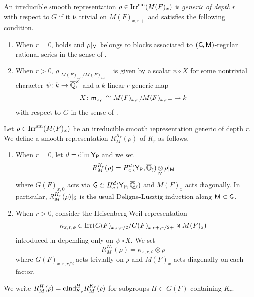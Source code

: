 \documentclass[12pt,reqno]{amsart}
\begin{document}
\begin{defi}
    An irreducible smooth representation $\rho \in {\operatorname{Irr}}^{\operatorname{sm}}(M(F)_{x})$ is \textit{generic of depth $r$} with respect to $G$ if it is trivial on $M(F)_{x, r+}$ and satisfies the following condition. 
    \begin{enumerate}
        \item When $r = 0$,  holds and $\rho \vert_{{\mathsf{M}}}$ belongs to blocks associated to $({\mathsf{G}}, {\mathsf{M}})$-regular rational series in the sense of \cite[{}11.4]{BR03}. 
        \item When $r > 0$, $\rho \vert_{M(F)_{x, r} / M(F)_{x, r+}}$ is given by a scalar $\psi \circ X$ for some nontrivial character $\psi \colon k \to {\overline{\mathbb{Q}}_\ell^\times}$ and a $k$-linear $r$-generic map 
        \[
            X \colon {\mathsf{m}}_{x, r} \cong M(F)_{x, r} / M(F)_{x, r+} \to k
        \]
        with respect to $G$ in the sense of \cite[Definition 3.1]{Tak26_Yu}. 
    \end{enumerate}
\end{defi}

\begin{defi} \label{defi:R_induction}
    Let $\rho \in {\operatorname{Irr}}^{\operatorname{sm}}(M(F)_{x})$ be an irreducible smooth representation generic of depth $r$. We define a smooth representation $R^{K_r}_M(\rho)$ of $K_r$ as follows. 
    \begin{enumerate}
        \item When $r = 0$, let $d = \dim {\mathsf{Y}}_{{\mathsf{P}}}$ and we set
        \[
            R^{K_r}_M(\rho) = H_c^d({\mathsf{Y}}_{{\mathsf{P}}}, {\overline{\mathbb{Q}}_\ell}) \mathop{\otimes}\limits_{{\mathsf{M}}} \rho\vert_{{\mathsf{M}}}
        \]
        where $G(F)_{x, 0}$ acts via ${\mathsf{G}} \circlearrowright H_c^d({\mathsf{Y}}_{{\mathsf{P}}}, {\overline{\mathbb{Q}}_\ell})$ and $M(F)_x$ acts diagonally. In particular, $R^{K_r}_M(\rho)\vert_{{\mathsf{G}}}$ is the usual Deligne-Lusztig induction along ${\mathsf{M}} \subset {\mathsf{G}}$. 
        \item When $r > 0$, consider the Heisenberg-Weil representation 
        \[
            \kappa_{x, r, \phi} \in {\operatorname{Irr}}(G(F)_{x, r, r/2} / G(F)_{x, r+, r/2+} \rtimes M(F)_{x})
        \]
        introduced in \cite[Lemma 3.2]{Tak26_Yu} depending only on $\psi \circ X$. We set
        \[
            R^{K_r}_M(\rho) = \kappa_{x, r, \phi} \otimes \rho
        \]
        where $G(F)_{x, r, r/2}$ acts trivially on $\rho$ and $M(F)_x$ acts diagonally on each factor. 
    \end{enumerate}
    We write $R^H_M(\rho) = {\operatorname{cInd}}_{K_r}^H R^{K_r}_M(\rho)$ for subgroups $H \subset G(F)$ containing $K_r$. 
\end{defi}
\end{document}
